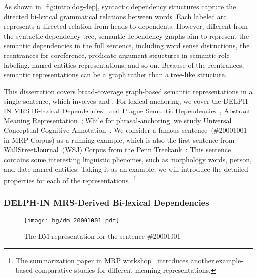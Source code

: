 As shown in~\autoref{fig:intro:dog-dep}, syntactic dependency
structures capture the directed bi-lexical grammatical relations
between words. Each labeled arc represents a directed relation from
heads to dependents. However, different from the syntactic dependency
tree, semantic dependency graphs aim to represent the semantic
dependencies in the full sentence, including word sense distinctions,
the reentrances for coreference, predicate-argument structures in
semantic role labeling, named entities representations, and so
on. Because of the reentrances, semantic representations can be a
graph rather than a tree-like structure.

This dissertation covers
broad-coverage graph-based semantic representations in a single
sentence, which involves  and
. For lexical anchoring, we cover the DELPH-IN
MRS Bi-lexical Dependencies~\cite[DM,][]{ivanova2012did} and Prague
Semantic
Dependencies~\cite[PSD,][]{hajic2012announcing,miyao2014house},
Abstract Meaning Representation~\cite[AMR,][]{Ban:Bon:Cai:13}; While
for phrasal-anchoring, we study Universal Conceptual Cognitive
Annotation~\cite[UCCA,][]{Abe:Rap:13b}. We consider a famous
sentence~(\#20001001 in MRP Corpus) as a running example, which is
also the first sentence from WallStreetJournal~(WSJ) Corpus from the
Penn Treebank~\citep{Mar:San:Mar:93}: \emph{} This sentence contains some interesting linguistic
phenomes, such as morphology words, person, and date named
entities. Taking it as an example, we will introduce the detailed
properties for each of the representations.~\footnote{The
  summarization paper in MRP workshop~\citep{Mar:San:Mar:93}
  introduces another example-based comparative studies for different
  meaning representations.}


\subsubsection{DELPH-IN MRS-Derived Bi-lexical Dependencies}
\label{sssec:bg:dm}

\begin{figure}[!th]
\centering
\texttt{[image: bg/dm-20001001.pdf]}
\caption{\label{fig:bg:dm}The DM representation for the sentence
  \#20001001}
\end{figure}

